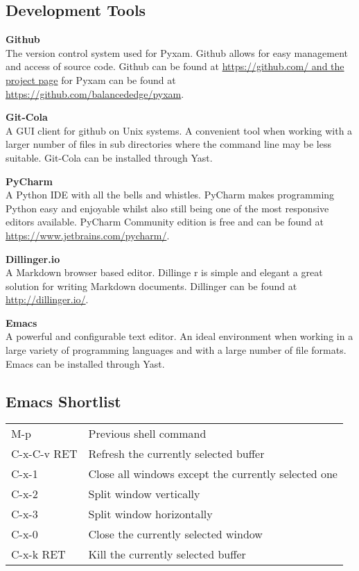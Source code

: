 \documentclass[9pt]{extarticle}
\begin{document}
\begin{multicols}{2}
\subsection*{Development Tools}
\begin{description}
    \item {\bf Github} \\
        The version control system used for Pyxam. Github allows for easy
        management and access of source code. Github can be found at
        \url{https://github.com/ and the project page} for Pyxam
        can be found at \url{https://github.com/balancededge/pyxam}.  
    \item {\bf Git-Cola} \\
        A GUI client for github on Unix systems. A convenient tool when
        working with a larger number of files in sub directories where the
        command line may be less suitable. Git-Cola can be installed through
        Yast.
    \item {\bf PyCharm} \\
        A Python IDE with all the bells and whistles. PyCharm makes
        programming Python easy and enjoyable whilst also still being one of the
        most responsive editors available. PyCharm Community edition is free
        and can be found at \url{https://www.jetbrains.com/pycharm/}.
    \item {\bf Dillinger.io} \\
        A Markdown browser based editor. Dillinge   r is simple and elegant a
        great solution for writing Markdown documents. Dillinger can be found
        at \url{http://dillinger.io/}.
    \item {\bf Emacs } \\
        A powerful and configurable text editor. An ideal environment when
        working in a large variety of programming languages and with a large
        number of file formats. Emacs can be installed through Yast.
\end{description}
\subsection*{Emacs Shortlist}
\begin{tabular}{l l}
M-p & Previous shell command \\
C-x-C-v RET & Refresh the currently selected buffer \\
C-x-1 & Close all windows except the currently selected one \\
C-x-2 & Split window vertically \\
C-x-3 & Split window horizontally \\
C-x-0 & Close the currently selected window \\
C-x-k RET & Kill the currently selected buffer \\
\end{tabular}

\end{multicols}
\end{document}
